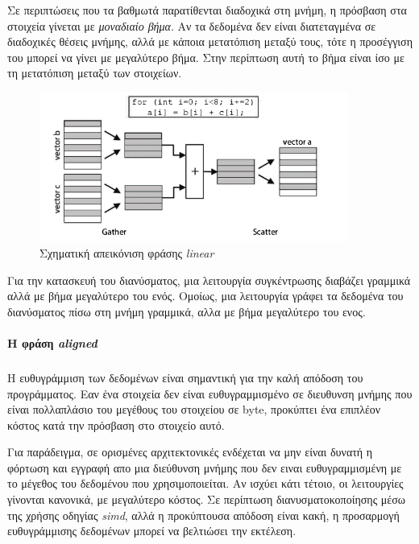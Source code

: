 \documentclass[12pt]{article}
\newcommand{\en}[1]{\foreignlanguage{english}{#1}}
\begin{document}
Σε περιπτώσεις που τα βαθμωτά παρατίθενται διαδοχικά στη μνήμη, η πρόσβαση στα στοιχεία γίνεται με \emph{μοναδιαίο βήμα}. Αν τα δεδομένα δεν είναι διατεταγμένα σε διαδοχικές θέσεις μνήμης, αλλά με  κάποια μετατόπιση μεταξύ τους, τότε η προσέγγιση του μπορεί να γίνει με μεγαλύτερο βήμα. Στην περίπτωση αυτή το βήμα είναι ίσο με τη μετατόπιση μεταξύ των στοιχείων.

\begin{figure}[h]
\includegraphics[width=0.9\textwidth]{linear_clause_simd}
\centering
\captionsetup{justification=centering, singlelinecheck=false}
	\caption{Σχηματική απεικόνιση φράσης \emph{\en{linear}}}
\label{fig:linear_clause_simd}
\end{figure}

Για την κατασκευή του διανύσματος, μια λειτουργία συγκέντρωσης διαβάζει γραμμικά αλλά με βήμα μεγαλύτερο του ενός. Ομοίως, μια λειτουργία γράφει τα δεδομένα του διανύσματος πίσω στη μνήμη γραμμικά, αλλα με βήμα μεγαλύτερο του ενος.


\paragraph{H φράση \emph{\en{aligned}}}
\subparagraph{}
Η ευθυγράμμιση των δεδομένων είναι σημαντική για την καλή απόδοση του προγράμματος. Εαν ένα στοιχεία δεν είναι ευθυγραμμισμένο σε διευθυνση μνήμης που είναι πολλαπλάσιο του μεγέθους του στοιχείου σε byte, προκύπτει ένα επιπλέον κόστος  κατά την πρόσβαση στο στοιχείο αυτό.

Για παράδειγμα, σε ορισμένες αρχιτεκτονικές ενδέχεται να μην είναι δυνατή η φόρτωση και εγγραφή απο μια διεύθυνση μνήμης που δεν ειναι ευθυγραμμισμένη με το μέγεθος του δεδομένου που χρησιμοποιείται. Αν ισχύει κάτι τέτοιο, οι λειτουργίες γίνονται κανονικά, με μεγαλύτερο κόστος. Σε περίπτωση διανυσματοκοποίησης μέσω της χρήσης οδηγίας \emph{\en{simd}}, αλλά η προκύπτουσα απόδοση είναι κακή, η προσαρμογή ευθυγράμμισης δεδομένων μπορεί να βελτιώσει την εκτέλεση.
\end{document}
